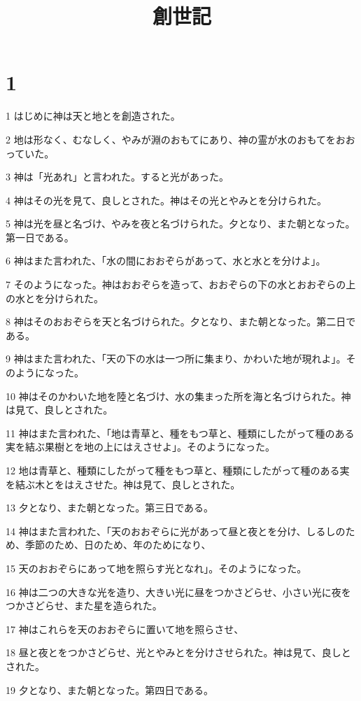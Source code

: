 

\title{創世記}


\chapter{1}

\par 1 はじめに神は天と地とを創造された。
\par 2 地は形なく、むなしく、やみが淵のおもてにあり、神の霊が水のおもてをおおっていた。
\par 3 神は「光あれ」と言われた。すると光があった。
\par 4 神はその光を見て、良しとされた。神はその光とやみとを分けられた。
\par 5 神は光を昼と名づけ、やみを夜と名づけられた。夕となり、また朝となった。第一日である。
\par 6 神はまた言われた、「水の間におおぞらがあって、水と水とを分けよ」。
\par 7 そのようになった。神はおおぞらを造って、おおぞらの下の水とおおぞらの上の水とを分けられた。
\par 8 神はそのおおぞらを天と名づけられた。夕となり、また朝となった。第二日である。
\par 9 神はまた言われた、「天の下の水は一つ所に集まり、かわいた地が現れよ」。そのようになった。
\par 10 神はそのかわいた地を陸と名づけ、水の集まった所を海と名づけられた。神は見て、良しとされた。
\par 11 神はまた言われた、「地は青草と、種をもつ草と、種類にしたがって種のある実を結ぶ果樹とを地の上にはえさせよ」。そのようになった。
\par 12 地は青草と、種類にしたがって種をもつ草と、種類にしたがって種のある実を結ぶ木とをはえさせた。神は見て、良しとされた。
\par 13 夕となり、また朝となった。第三日である。
\par 14 神はまた言われた、「天のおおぞらに光があって昼と夜とを分け、しるしのため、季節のため、日のため、年のためになり、
\par 15 天のおおぞらにあって地を照らす光となれ」。そのようになった。
\par 16 神は二つの大きな光を造り、大きい光に昼をつかさどらせ、小さい光に夜をつかさどらせ、また星を造られた。
\par 17 神はこれらを天のおおぞらに置いて地を照らさせ、
\par 18 昼と夜とをつかさどらせ、光とやみとを分けさせられた。神は見て、良しとされた。
\par 19 夕となり、また朝となった。第四日である。
